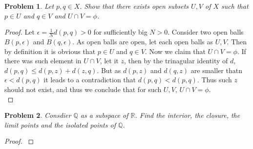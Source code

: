 \documentclass[paper=a4, fontsize=11pt]{scrartcl}
\newcommand{\overbar}[1]{
	\mkern 1.5mu \overline{\mkern-1.5mu\raisebox{0pt}[\dimexpr\height+0.5mm\relax]{$#1$}\mkern-1.5mu}\mkern 1.5mu
}
\newtheorem{problem}{Problem}
\begin{document}
\begin{problem}
	Let $p,q\in X$. Show that there exists open subsets $U,V$ of $X$ such that $p\in U$ and $q \in V$ and $U \cap V = \phi$.\\
\end{problem}

\begin{proof}
	Let $\epsilon = \frac{1}{N} d(p,q) >0$ for sufficiently big $N>0$. Consider two open balls $B(p,\epsilon)$ and $B(q,\epsilon)$. As open balls are open, let each open balls as $U,V$. Then by definition it is obvious that $p\in U$ and $q \in V$. Now we claim that $U \cap V = \phi$. If there was such element in $U \cap V$, let it $z$, then by the trinagular identity of $d$, $d(p,q)\leq d(p,z) + d(z,q)$. But as $d(p,z)$ and $d(q,z)$ are smaller thatn $\epsilon < d(p,q)$ it leads to a contradiction that $d(p,q) < d(p,q)$. Thus such $z$ should not exist, and thus we conclude that for such $U,V$, $U \cap V = \phi$.\\
\end{proof}

\begin{problem}
	Consdier $\mathbb{Q}$ as a subspace of $\mathbb{R}$. Find the interior, the closure, the limit points and the isolated points of $\mathbb{Q}$.\\
\end{problem}

\begin{proof}
$ $ \newline
\vspace{-0.15in}
\end{proof}
\end{document}
